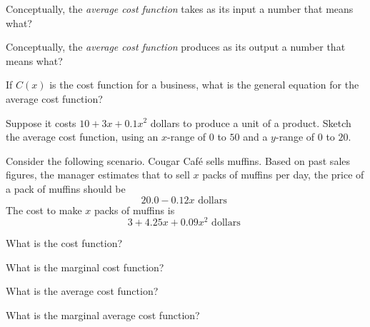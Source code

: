 \label{sec:biz-mod-avg-cost}

\begin{ProblemSet}[pencil space=1in]
 \begin{Problem}
  Conceptually, the \emph{average cost function} takes as its input a number that means what?
 \end{Problem}
 \begin{Problem}
  Conceptually, the \emph{average cost function} produces as its output a number that means what?
 \end{Problem}
 \begin{Problem}
  If $C(x)$ is the cost function for a business, what is the general equation for the average cost function?
 \end{Problem}
 \begin{Problem}
  Suppose it costs $10 + 3x + 0.1 x^2$ dollars to produce a unit of a product.
  Sketch the average cost function, using an $x$-range of $0$ to $50$ and a $y$-range of $0$ to $20$.
  \bigskip

  \GraphingGridSmall
 \end{Problem}
\end{ProblemSet}

\newpage
Consider the following scenario.
Cougar Caf\'e sells muffins.
Based on past sales figures, the manager estimates that to sell $x$ packs of muffins per day, the price of a pack of muffins should be
\begin{equation*}
 20.0 - 0.12 x \text{ dollars }
\end{equation*}
The cost to make $x$ packs of muffins is
\begin{equation*}
 3 + 4.25 x + 0.09 x^2 \text{ dollars }
\end{equation*}


\begin{ProblemSet}[pencil space=1in]
 \begin{Problem}
  What is the cost function?
 \end{Problem}
 \begin{Problem}
  What is the marginal cost function?
 \end{Problem}
 \begin{Problem}[pencil space=2in]
  What is the average cost function?
 \end{Problem}
 \begin{Problem}[pencil space=2in]
  What is the marginal average cost function?
 \end{Problem}
\end{ProblemSet}

